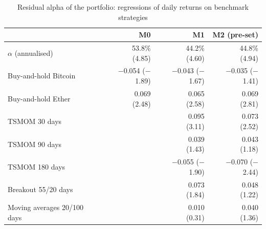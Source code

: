 \documentclass[11pt,a4paper]{article}
\newcommand{\1}{\mathbf{1}}
\begin{document}
\begin{table}[tbp]
\centering\small
\begin{threeparttable}
\caption{Residual alpha of the portfolio: regressions of daily returns on benchmark strategies}\label{tab:alpha}
\begin{tabular}{lrrr}
\toprule
 & M0 & M1 & M2 (pre-set) \\
\midrule
$\alpha$ (annualised) & \makecell[r]{53.8\%\\[-1pt]{\scriptsize(4.85)}} & \makecell[r]{44.2\%\\[-1pt]{\scriptsize(4.60)}} & \makecell[r]{44.8\%\\[-1pt]{\scriptsize(4.94)}} \\
\addlinespace
Buy-and-hold Bitcoin & \makecell[r]{\ensuremath{-}0.054\\[-1pt]{\scriptsize(\ensuremath{-}1.89)}} & \makecell[r]{\ensuremath{-}0.043\\[-1pt]{\scriptsize(\ensuremath{-}1.67)}} & \makecell[r]{\ensuremath{-}0.035\\[-1pt]{\scriptsize(\ensuremath{-}1.41)}} \\
Buy-and-hold Ether & \makecell[r]{0.069\\[-1pt]{\scriptsize(2.48)}} & \makecell[r]{0.065\\[-1pt]{\scriptsize(2.58)}} & \makecell[r]{0.069\\[-1pt]{\scriptsize(2.81)}} \\
TSMOM 30 days &  & \makecell[r]{0.095\\[-1pt]{\scriptsize(3.11)}} & \makecell[r]{0.073\\[-1pt]{\scriptsize(2.52)}} \\
TSMOM 90 days &  & \makecell[r]{0.039\\[-1pt]{\scriptsize(1.43)}} & \makecell[r]{0.043\\[-1pt]{\scriptsize(1.18)}} \\
TSMOM 180 days &  & \makecell[r]{\ensuremath{-}0.055\\[-1pt]{\scriptsize(\ensuremath{-}1.90)}} & \makecell[r]{\ensuremath{-}0.070\\[-1pt]{\scriptsize(\ensuremath{-}2.44)}} \\
Breakout 55/20 days &  & \makecell[r]{0.073\\[-1pt]{\scriptsize(1.84)}} & \makecell[r]{0.048\\[-1pt]{\scriptsize(1.22)}} \\
Moving averages 20/100 days &  & \makecell[r]{0.010\\[-1pt]{\scriptsize(0.31)}} & \makecell[r]{0.040\\[-1pt]{\scriptsize(1.36)}} \\

\end{tabular}
\end{threeparttable}
\end{table}
\end{document}
